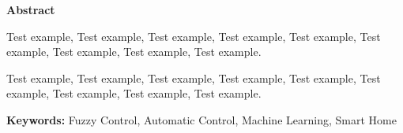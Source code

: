 \begin{center}
	\LARGE {\textbf{Abstract}}
\end{center}

\bigskip  %
Test example, Test example, Test example, Test example, Test example, Test example, Test example, Test example, Test example.

\bigskip  %
Test example, Test example, Test example, Test example, Test example, Test example, Test example, Test example,  Test example.

\vspace{3em}
\noindent %
\textbf{Keywords:} Fuzzy Control, Automatic Control, Machine Learning, Smart Home
